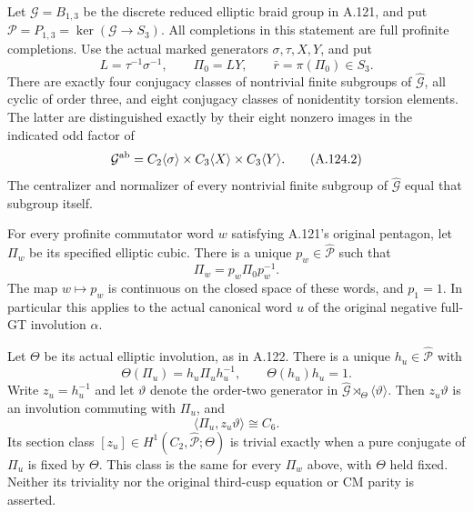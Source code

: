 Let \(\mathcal G=B_{1,3}\) be the discrete reduced elliptic braid
group in A.121, and put
\(\mathcal P=P_{1,3}=\ker(\mathcal G\to S_3)\).
All completions in this statement are full profinite completions.
Use the actual marked generators \(\sigma,\tau,X,Y\), and put
\[
 L=\tau^{-1}\sigma^{-1},\qquad \Pi_0=LY,
 \qquad \bar r=\pi(\Pi_0)\in S_3.
 \tag{A.124.1}
\]
There are exactly four conjugacy classes of nontrivial finite subgroups
of \(\widehat{\mathcal G}\), all cyclic of order three, and eight
conjugacy classes of nonidentity torsion elements. The latter are
distinguished exactly by their eight nonzero images in the indicated
odd factor of
\[
 \mathcal G^{\rm ab}
   =C_2\langle\sigma\rangle\times
     C_3\langle X\rangle\times C_3\langle Y\rangle.
 \tag{A.124.2}
\]
The centralizer and normalizer of every nontrivial finite subgroup
of \(\widehat{\mathcal G}\) equal that subgroup itself.

For every profinite commutator word \(w\) satisfying A.121's original
pentagon, let \(\Pi_w\) be its specified elliptic cubic. There is a
unique \(p_w\in\widehat{\mathcal P}\) such that
\[
                  \Pi_w=p_w\Pi_0p_w^{-1}.
 \tag{A.124.3}
\]
The map \(w\mapsto p_w\) is continuous on the closed space of these
words, and \(p_1=1\). In particular this applies to the actual canonical
word \(u\) of the original negative full-GT involution \(\alpha\).

Let \(\Theta\) be its actual elliptic involution, as in A.122.
There is a unique \(h_u\in\widehat{\mathcal P}\) with
\[
 \Theta(\Pi_u)=h_u\Pi_uh_u^{-1},\qquad
 \Theta(h_u)h_u=1.
 \tag{A.124.4}
\]
Write \(z_u=h_u^{-1}\) and let \(\vartheta\) denote the order-two
generator in
\(\widehat{\mathcal G}\rtimes_\Theta\langle\vartheta\rangle\).
Then \(z_u\vartheta\) is an involution commuting with \(\Pi_u\), and
\[
              \langle\Pi_u,z_u\vartheta\rangle\cong C_6.
 \tag{A.124.5}
\]
Its section class \([z_u]\in H^1(C_2,\widehat{\mathcal P};\Theta)\)
is trivial exactly when a pure conjugate of \(\Pi_u\) is fixed by
\(\Theta\). This class is the same for every \(\Pi_w\) above, with
\(\Theta\) held fixed. Neither its triviality nor the original
third-cusp equation or CM parity is asserted.


